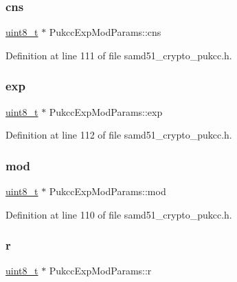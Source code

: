 \subsubsection{\texorpdfstring{cns}{cns}}
{\footnotesize\ttfamily \hyperlink{stdint_8h_aba7bc1797add20fe3efdf37ced1182c5}{uint8\+\_\+t} $\ast$ Pukcc\+Exp\+Mod\+Params\+::cns}



Definition at line 111 of file samd51\+\_\+crypto\+\_\+pukcc.\+h.

\mbox{\label{structPukccExpModParams_afcf095e646200687b7771a108d001249}} 
\subsubsection{\texorpdfstring{exp}{exp}}
{\footnotesize\ttfamily \hyperlink{stdint_8h_aba7bc1797add20fe3efdf37ced1182c5}{uint8\+\_\+t} $\ast$ Pukcc\+Exp\+Mod\+Params\+::exp}



Definition at line 112 of file samd51\+\_\+crypto\+\_\+pukcc.\+h.

\mbox{\label{structPukccExpModParams_af176be1f82564603bba8637782bbffe2}} 
\subsubsection{\texorpdfstring{mod}{mod}}
{\footnotesize\ttfamily \hyperlink{stdint_8h_aba7bc1797add20fe3efdf37ced1182c5}{uint8\+\_\+t} $\ast$ Pukcc\+Exp\+Mod\+Params\+::mod}



Definition at line 110 of file samd51\+\_\+crypto\+\_\+pukcc.\+h.

\mbox{\label{structPukccExpModParams_aa5d6ccb73961725de58d96d15047392c}} 
\subsubsection{\texorpdfstring{r}{r}}
{\footnotesize\ttfamily \hyperlink{stdint_8h_aba7bc1797add20fe3efdf37ced1182c5}{uint8\+\_\+t} $\ast$ Pukcc\+Exp\+Mod\+Params\+::r}



